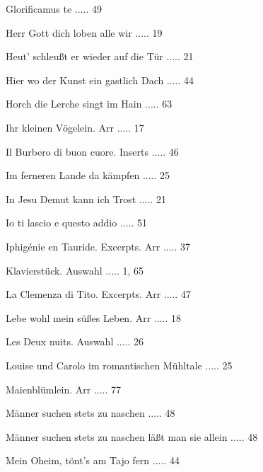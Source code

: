 \documentclass[a4paper, twocolumn, 11pt]{book}
\begin{document}
\newline 
Glorificamus te ..... 49

\newline 
Herr Gott dich loben alle wir ..... 19

\newline 
Heut' schleußt er wieder auf die Tür ..... 21

\newline 
Hier wo der Kunst ein gastlich Dach ..... 44

\newline 
Horch die Lerche singt im Hain ..... 63

\newline 
Ihr kleinen Vögelein. Arr ..... 17

\newline 
Il Burbero di buon cuore. Inserts ..... 46

\newline 
Im ferneren Lande da kämpfen ..... 25

\newline 
In Jesu Demut kann ich Trost ..... 21

\newline 
Io ti lascio e questo addio ..... 51

\newline 
Iphigénie en Tauride. Excerpts. Arr ..... 37

\newline 
Klavierstück. Auswahl ..... 1, 65

\newline 
La Clemenza di Tito. Excerpts. Arr ..... 47

\newline 
Lebe wohl mein süßes Leben. Arr ..... 18

\newline 
Les Deux nuits. Auswahl ..... 26

\newline 
Louise und Carolo im romantischen Mühltale ..... 25

\newline 
Maienblümlein. Arr ..... 77

\newline 
Männer suchen stets zu naschen ..... 48

\newline 
Männer suchen stets zu naschen läßt man sie allein ..... 48

\newline 
Mein Oheim, tönt’s am Tajo fern ..... 44
\end{document}
